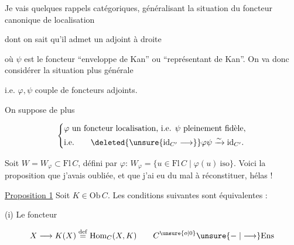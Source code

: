 
Je vais  quelques rappels catégoriques, généralisant la situation du foncteur canonique de localisation


dont on sait qu'il admet un adjoint à droite


où $\psi$ est le foncteur ``enveloppe de Kan'' ou ``représentant de Kan''. On va donc considérer la situation plus générale


i.e. $\varphi,\psi$ couple de foncteurs adjoints.

On suppose de plus

\[
 \left\{\begin{aligned}
 &\varphi\ \text{un foncteur localisation, i.e. }\psi\ \text{pleinement fidèle},\\
 &\text{i.e.}\qquad\deleted{\unsure{\mathrm{id}_{C'}\longrightarrow}}
  \varphi\psi\xrightarrow{\sim}\mathrm{id}_{C'} .
 \end{aligned}\right.
\]

Soit $W=W_{\varphi}\subset\mathrm{Fl}\,C$,  défini par $\varphi$: $W_\varphi=\{u\in\mathrm{Fl}\,C\mid\varphi(u)\ \mathrm{iso}\}$. Voici la proposition que j'avais oubliée, et que j'ai eu du mal à réconstituer, hélas !

\uline{Proposition 1} Soit $K\in\mathrm{Ob}\,C$. Les conditions suivantes  sont équivalentes :

(i) Le foncteur

\[
 X\longrightarrow K(X)\overset{\mathrm{def}}{=}\mathrm{Hom}_C(X,K)
 \qquad C^{\unsure{o|0}}\unsure{\relbar|\longrightarrow}\mathrm{Ens}
\]

